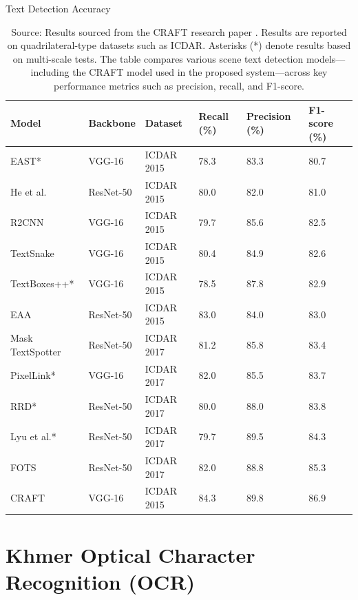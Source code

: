 \begin{table}[H]
  \centering
  \caption{Text Detection Accuracy}
  \begin{tabularx}{\linewidth}{|L{3.5cm}|L{2.5cm}|L{2.5cm}|C{2cm}|C{2cm}|C{2cm}|}
    \hline
    \textbf{Model} & \textbf{Backbone} & \textbf{Dataset} & \textbf{Recall (\%)} & \textbf{Precision (\%)} & \textbf{F1-score (\%)} \\
    \hline
    EAST* & VGG-16 & ICDAR 2015 & 78.3 & 83.3 & 80.7 \\
    He et al. & ResNet-50 & ICDAR 2015 & 80.0 & 82.0 & 81.0 \\
    R2CNN & VGG-16 & ICDAR 2015 & 79.7 & 85.6 & 82.5 \\
    TextSnake & VGG-16 & ICDAR 2015 & 80.4 & 84.9 & 82.6 \\
    TextBoxes++* & VGG-16 & ICDAR 2015 & 78.5 & 87.8 & 82.9 \\
    EAA & ResNet-50 & ICDAR 2015 & 83.0 & 84.0 & 83.0 \\
    Mask TextSpotter & ResNet-50 & ICDAR 2017 & 81.2 & 85.8 & 83.4 \\
    PixelLink* & VGG-16 & ICDAR 2017 & 82.0 & 85.5 & 83.7 \\
    RRD* & ResNet-50 & ICDAR 2017 & 80.0 & 88.0 & 83.8 \\
    Lyu et al.* & ResNet-50 & ICDAR 2017 & 79.7 & 89.5 & 84.3 \\
    FOTS & ResNet-50 & ICDAR 2017 & 82.0 & 88.8 & 85.3 \\
    CRAFT & VGG-16 & ICDAR 2015 & 84.3 & 89.8 & 86.9 \\
    \hline
  \end{tabularx}
  \caption*{Source: Results sourced from the CRAFT research paper \cite{Hiremath_text_detection}. 
  Results are reported on quadrilateral-type datasets such as ICDAR. 
  Asterisks (*) denote results based on multi-scale tests. 
  The table compares various scene text detection models—including the CRAFT model used in the proposed system—across key performance metrics such as precision, recall, and F1-score.}
  \label{tab:text_detection_accuracy}
\end{table}

\vspace{1em}



\section{Khmer Optical Character Recognition (OCR)}
\label{sec:khmer_OCR_literature}

